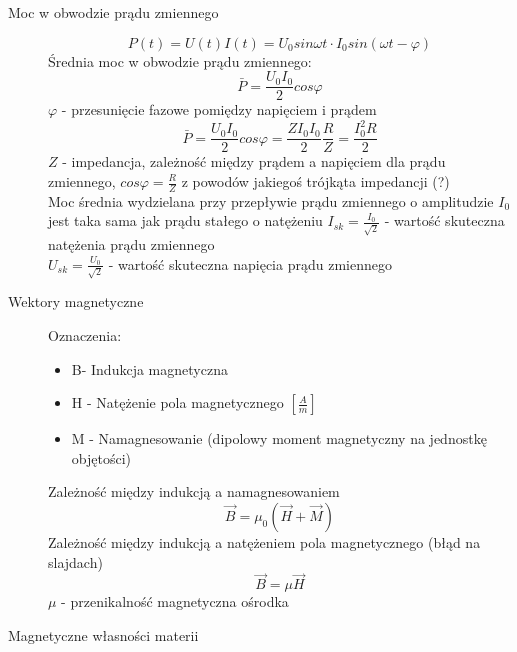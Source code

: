 \documentclass[a4paper,11pt]{article}
\begin{document}
\begin{description}
\item[Moc w obwodzie prądu zmiennego]
  $$P(t)=U(t)I(t) = U_0sin\omega t\cdot I_0 sin\left(\omega t - \varphi \right)$$
  Średnia moc w obwodzie prądu zmiennego:
  $$\bar{P} = \frac{U_0I_0}{2}cos\varphi$$
  $\varphi$ - przesunięcie fazowe pomiędzy napięciem i prądem
  $$\bar{P} = \frac{U_0I_0}{2}cos\varphi=\frac{ZI_0I_0}{2}\frac{R}{Z} = \frac{I^2_0R}{2}$$
  $Z$ - impedancja, zależność między prądem a napięciem dla prądu zmiennego, $cos\varphi=\frac{R}{Z}$ z powodów jakiegoś trójkąta impedancji (?) \\
  Moc średnia wydzielana przy przepływie prądu zmiennego o amplitudzie $I_0$ jest taka sama jak prądu stałego o natężeniu $I_{sk} = \frac{I_0}{\sqrt{2}}$ - wartość skuteczna natężenia prądu zmiennego\\
  $U_{sk}=\frac{U_0}{\sqrt{2}}$ - wartość skuteczna napięcia prądu zmiennego

\item[Wektory magnetyczne] Oznaczenia:\\
  \begin{itemize}
  \item B- Indukcja magnetyczna
  \item H - Natężenie pola magnetycznego $\left[\frac{A}{m}\right]$
  \item M - Namagnesowanie (dipolowy moment magnetyczny na jednostkę objętości)
  \end{itemize}
  Zależność między indukcją a namagnesowaniem
  $$\vec{B} = \mu_0\left(\vec{H}+\vec{M}\right)$$
  Zależność między indukcją a natężeniem pola magnetycznego (błąd na slajdach) 
  $$\vec{B} = \mu\vec{H}$$
  $\mu$ - przenikalność magnetyczna ośrodka
\item[Magnetyczne własności materii]


\end{description}
\end{document}
